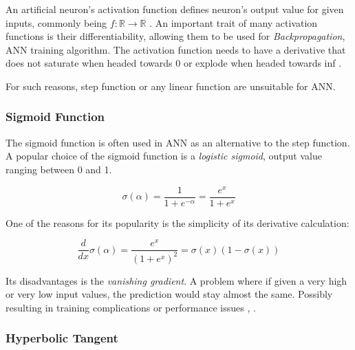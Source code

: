 An artificial neuron's activation function defines neuron's output value for given inputs, commonly being ${f: \mathbb{R} \rightarrow \mathbb{R}}$ \cite{leskovec2020mining}. An important trait of many activation functions is their differentiability, allowing them to be used for \textit{Backpropagation}, ANN training algorithm. The activation function needs to have a derivative that does not saturate when headed towards 0 or explode when headed towards inf \cite{matous}.

For such reasons, step function or any linear function are unsuitable for ANN.
\subsubsection{Sigmoid Function}
The sigmoid function is often used in ANN as an alternative to the step function. A popular choice of the sigmoid function is a \textit{logistic sigmoid}, output value ranging between 0 and 1.

\begin{equation}
    {\sigma(\alpha) = \frac{1}{1 + e^{-\alpha}} = \frac{e^x}{1 + e^{x}}}
\end{equation}




One of the reasons for its popularity is the simplicity of its derivative calculation:

\begin{equation}
    {\frac{d}{dx}\sigma(\alpha) = \frac{e^x}{(1 + e^{x})^2} = \sigma(x)(1-\sigma(x))}
\end{equation}


Its disadvantages is the \textit{vanishing gradient}. A problem where if given a very high or very low input values, the prediction would stay almost the same. Possibly resulting in training complications or performance issues \cite{7typesactivationfunctions}, \cite{matous}.


\subsubsection{Hyperbolic Tangent}

